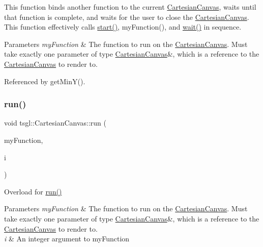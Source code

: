 This function binds another function to the current \hyperlink{classtsgl_1_1_cartesian_canvas}{Cartesian\+Canvas}, waits until that function is complete, and waits for the user to close the \hyperlink{classtsgl_1_1_cartesian_canvas}{Cartesian\+Canvas}. This function effectively calls \hyperlink{classtsgl_1_1_canvas_a654315f9b08a9b3b072eebf4b4d8ae89}{start()}, {\ttfamily my\+Function}(), and \hyperlink{classtsgl_1_1_canvas_a39e69fd4d1ad8cf0e22ecea12f1ddf08}{wait()} in sequence. 
\begin{DoxyParams}{Parameters}
{\em my\+Function} & The function to run on the \hyperlink{classtsgl_1_1_cartesian_canvas}{Cartesian\+Canvas}. Must take exactly one parameter of type \hyperlink{classtsgl_1_1_cartesian_canvas}{Cartesian\+Canvas}\&, which is a reference to the \hyperlink{classtsgl_1_1_cartesian_canvas}{Cartesian\+Canvas} to render to. \\
\hline
\end{DoxyParams}


Referenced by get\+Min\+Y().

\mbox{\label{classtsgl_1_1_cartesian_canvas_a4d50613e241cab83878aa4438f3db67e}} 
\subsubsection{\texorpdfstring{run()}{run()}\hspace{0.1cm}{\footnotesize\ttfamily [2/8]}}
{\footnotesize\ttfamily void tsgl\+::\+Cartesian\+Canvas\+::run (\begin{DoxyParamCaption}\item[{void($\ast$)(\hyperlink{classtsgl_1_1_cartesian_canvas}{Cartesian\+Canvas} \&, int)}]{my\+Function,  }\item[{int}]{i }\end{DoxyParamCaption})}



Overload for \hyperlink{classtsgl_1_1_cartesian_canvas_a63a948af53582b713957b872a765dcdb}{run()} 


\begin{DoxyParams}{Parameters}
{\em my\+Function} & The function to run on the \hyperlink{classtsgl_1_1_cartesian_canvas}{Cartesian\+Canvas}. Must take exactly one parameter of type \hyperlink{classtsgl_1_1_cartesian_canvas}{Cartesian\+Canvas}\&, which is a reference to the \hyperlink{classtsgl_1_1_cartesian_canvas}{Cartesian\+Canvas} to render to. \\
\hline
{\em i} & An integer argument to my\+Function \\
\hline
\end{DoxyParams}
\mbox{\label{classtsgl_1_1_cartesian_canvas_ab18eee19a5a0c7011c4442b64d05f6cc}} 
